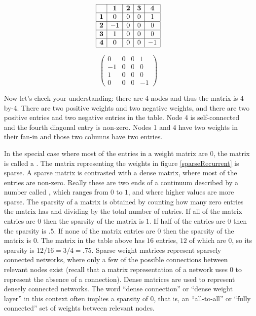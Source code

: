 \begin{minipage}{0.5\textwidth}
\centering
\[
\begin{array}{|c|c|c|c|c|}
\hline
\multicolumn{1}{|c|}{} & \textbf{1} & \textbf{2}  & \textbf{3} & \textbf{4} \\
\hline
\textbf{1} & 0 & 0 & 0 & 1 \\
\hline
\textbf{2} & -1 & 0 & 0 & 0 \\
\hline
\textbf{3} & 1 & 0 & 0 & 0 \\
\hline
\textbf{4} & 0 & 0 & 0 & -1 \\
\hline
\end{array}
\]
\end{minipage}
\begin{minipage}{0.5\textwidth}
\centering
\[
\begin{pmatrix}
0 & 0 & 0 & 1 \\
-1 & 0 & 0 & 0 \\
1 & 0 & 0 & 0 \\
0 & 0 & 0 & -1
\end{pmatrix}
\]
\end{minipage}
\vspace*{.1cm} 

\noindent Now let's check your understanding: there are 4 nodes and thus the matrix is 4-by-4. There are two positive weights and two negative weights, and there are two positive entries and two negative entries in the table. Node 4 is self-connected and the fourth diagonal entry is non-zero. Nodes 1 and 4 have two weights in their fan-in and those two columns have two entries.

In the special case where most of the entries in a weight matrix are $0$, the matrix is called a . The matrix representing the weights in figure \ref{sparseRecurrent} is sparse. A sparse matrix is contrasted with a dense matrix, where most of the entries are non-zero. Really these are two ends of a continuum described by a number called , which ranges from $0$ to $1$, and where higher values are more sparse. The sparsity of a matrix is obtained by counting how many zero entries the matrix has and dividing by the total number of entries. If all of the matrix entries are $0$ then the sparsity of the matrix is $1$. If half of the entries are $0$ then the sparsity is $.5$. If none of the matrix entries are $0$ then the sparsity of the matrix is $0$. The matrix in the table above has $16$ entries, $12$ of which are $0$, so its sparsity is $12/16 = 3/4 = .75$. Sparse weight matrices represent sparsely connected networks, where only a few of the possible connections between relevant nodes exist (recall that a matrix representation of a network uses $0$ to represent the absence of a connection). Dense matrices are used to represent densely connected networks. The word ``dense connection'' or ``dense weight layer'' in this context often implies a sparsity of $0$, that is, an ``all-to-all'' or ``fully connected'' set of weights between relevant nodes.

